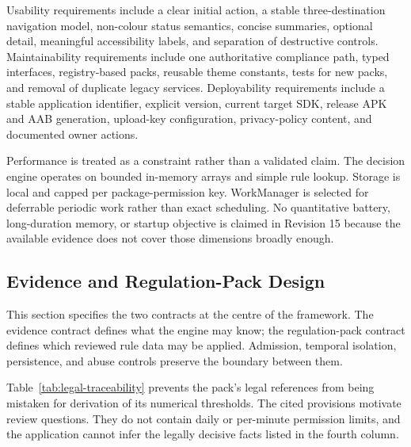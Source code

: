 Usability requirements include a clear initial action, a stable three-destination navigation model, non-colour status semantics, concise summaries, optional detail, meaningful accessibility labels, and separation of destructive controls. Maintainability requirements include one authoritative compliance path, typed interfaces, registry-based packs, reusable theme constants, tests for new packs, and removal of duplicate legacy services. Deployability requirements include a stable application identifier, explicit version, current target SDK, release APK and AAB generation, upload-key configuration, privacy-policy content, and documented owner actions.

Performance is treated as a constraint rather than a validated claim. The decision engine operates on bounded in-memory arrays and simple rule lookup. Storage is local and capped per package-permission key. WorkManager is selected for deferrable periodic work rather than exact scheduling. No quantitative battery, long-duration memory, or startup objective is claimed in Revision 15 because the available evidence does not cover those dimensions broadly enough.

\subsection{Evidence and Regulation-Pack Design}

This section specifies the two contracts at the centre of the framework. The evidence contract defines what the engine may know; the regulation-pack contract defines which reviewed rule data may be applied. Admission, temporal isolation, persistence, and abuse controls preserve the boundary between them.

Table~\ref{tab:legal-traceability} prevents the pack's legal references from being mistaken for derivation of its numerical thresholds. The cited provisions motivate review questions. They do not contain daily or per-minute permission limits, and the application cannot infer the legally decisive facts listed in the fourth column.

